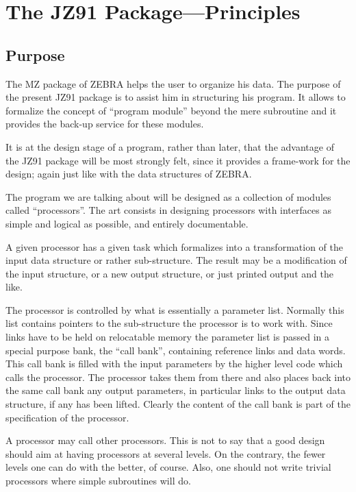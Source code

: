\chapter{The JZ91 Package---Principles}

\section{Purpose}

The MZ package of ZEBRA helps the user to organize his data.
The purpose of the present JZ91 package is to assist him
in structuring his program.
It allows to formalize the concept of ``program module''
beyond the mere subroutine
and it provides the back-up service for these modules.

It is at the design stage of a program,
rather than later,
that the advantage of the JZ91 package will be most strongly felt,
since it provides a frame-work for the design;
again just like with the data structures of ZEBRA.

The program we are talking about will be designed as
a collection of modules called ``processors''.
The art consists in designing processors with interfaces
as simple and logical as possible,
and entirely documentable.

A given processor has a given task
which formalizes into a transformation of the input data structure
or rather sub-structure.
The result may be a modification of the input structure,
or a new output structure,
or just printed output and the like.

The processor is controlled by what is essentially a parameter list.
Normally this list contains pointers to the sub-structure
the processor is to work with.
Since links have to be held on relocatable memory
the parameter list is passed in a special purpose bank,
the ``call bank'',
containing reference links and data words.
This call bank is filled with the input parameters
by the higher level code which calls the processor.
The processor takes them from there and also places back
into the same call bank any output parameters,
in particular links to the output data structure,
if any has been lifted.
Clearly the content of the call bank is part of
the specification of the processor.

A processor may call other processors.
This is not to say that a good design should aim
at having processors at several levels.
On the contrary, the fewer levels one can do with
the better, of course.
Also, one should not write trivial processors
where simple subroutines will do.

